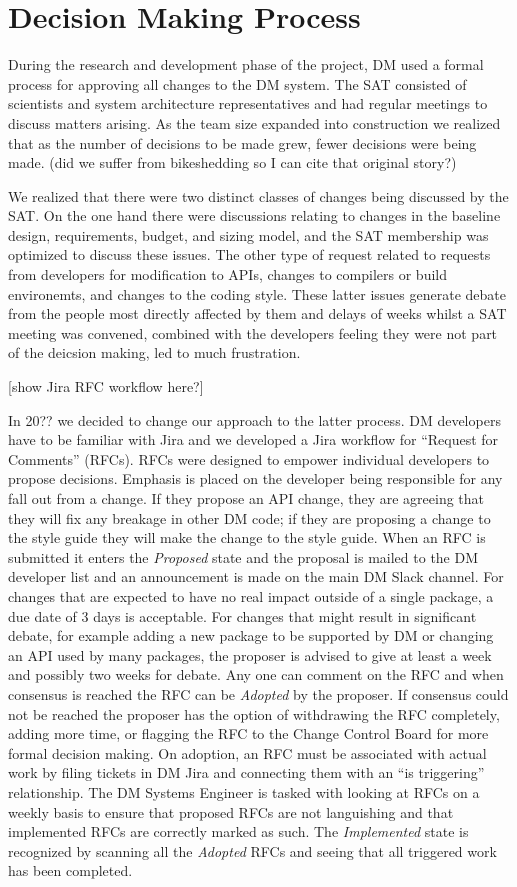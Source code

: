 \section{Decision Making Process}

During the research and development phase of the project, DM used a formal process for approving all changes to the DM system.
The SAT consisted of scientists and system architecture representatives and had regular meetings to discuss matters arising.
As the team size expanded into construction we realized that as the number of decisions to be made grew, fewer decisions were being made. (did we suffer from bikeshedding so I can cite that original story?)

We realized that there were two distinct classes of changes being discussed by the SAT.
On the one hand there were discussions relating to changes in the baseline design, requirements, budget, and sizing model, and the SAT membership was optimized to discuss these issues.
The other type of request related to requests from developers for modification to APIs, changes to compilers or build environemts, and changes to the coding style.
These latter issues generate debate from the people most directly affected by them and delays of weeks whilst a SAT meeting was convened, combined with the developers feeling they were not part of the deicsion making, led to much frustration.

[show Jira RFC workflow here?]

In 20?? we decided to change our approach to the latter process.
DM developers have to be familiar with Jira and we developed a Jira workflow for ``Request for Comments'' (RFCs).
RFCs were designed to empower individual developers to propose decisions.
Emphasis is placed on the developer being responsible for any fall out from a change.
If they propose an API change, they are agreeing that they will fix any breakage in other DM code; if they are proposing a change to the style guide they will make the change to the style guide.
When an RFC is submitted it enters the \emph{Proposed} state and the proposal is mailed to the DM developer list and an announcement is made on the main DM Slack channel.
For changes that are expected to have no real impact outside of a single package, a due date of 3 days is acceptable.
For changes that might result in significant debate, for example adding a new package to be supported by DM or changing an API used by many packages, the proposer is advised to give at least a week and possibly two weeks for debate.
Any one can comment on the RFC and when consensus is reached the RFC can be \emph{Adopted} by the proposer.
If consensus could not be reached the proposer has the option of withdrawing the RFC completely, adding more time, or flagging the RFC to the Change Control Board for more formal decision making.
On adoption, an RFC must be associated with actual work by filing tickets in DM Jira and connecting them with an ``is triggering'' relationship.
The DM Systems Engineer is tasked with looking at RFCs on a weekly basis to ensure that proposed RFCs are not languishing and that implemented RFCs are correctly marked as such.
The \emph{Implemented} state is recognized by scanning all the \emph{Adopted} RFCs and seeing that all triggered work has been completed.

